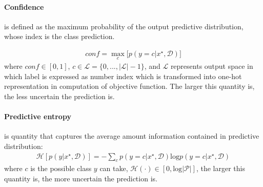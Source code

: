 \paragraph{Confidence} is defined as the maximum probability of the output predictive distribution, whose index is the class prediction.

\begin{equation}\label{confidence}	
\begin{aligned}
conf = \max_c \big[ p(y=c|x^\star, \mathcal D) \big]
\end{aligned}
\end{equation}
where $conf \in [0,1]$, $c \in \mathcal L = \{0,...,|\mathcal L|-1\}$, and $\mathcal L$ represents output space in which label is expressed as number index which is transformed into one-hot representation in computation of objective function. The larger this quantity is, the less uncertain the prediction is. 

\paragraph{Predictive entropy} is quantity that captures the average amount information contained in predictive distribution\cite{shannon1948mathematical}: 
\begin{equation}\label{entropy}	
\begin{aligned}
\mathcal H[p(y|x^\star, \mathcal D)] = -\sum_{c}p(y=c|x^\star, \mathcal D)\text{log}p(y=c|x^\star, \mathcal D)
\end{aligned}
\end{equation}
where $c$ is the possible class $y$ can take, $\mathcal H(\cdot) \in [0, \text{log}{|\mathcal P|}]$, the larger this quantity is, the more uncertain the prediction is.

